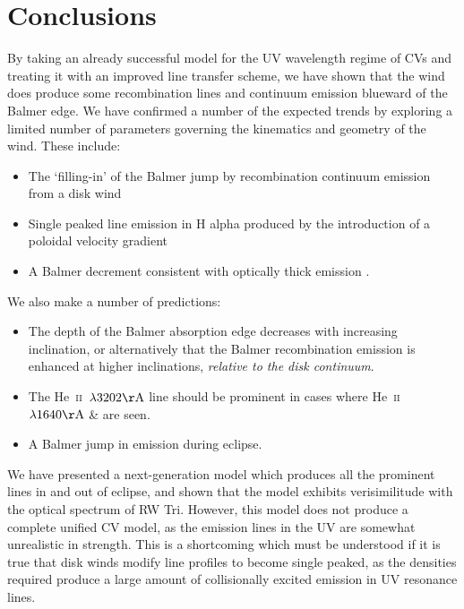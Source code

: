 \documentclass[preprint, a4paper, 11pt]{aastex}
\begin{document}
\newpage
%
%


\section{Conclusions}

By taking an already successful model
for the UV wavelength regime of CVs and treating 
it with an improved line transfer scheme, we have shown
that the wind does produce some recombination lines
and continuum emission blueward of the Balmer edge.
We have confirmed a number of the expected trends
by exploring a limited number of parameters governing the
kinematics and geometry of the wind. These include:

\renewcommand{\labelitemi}{$\bullet$}
\begin{itemize}
	\item The `filling-in' of the Balmer jump \citep{elitzur1983} by recombination 
	continuum emission from a disk wind
	\item Single peaked line emission in H alpha produced by 
	the introduction of a poloidal velocity gradient \citep{MC96}
	\item A Balmer decrement consistent with optically thick emission \citep{elitzur1983}.
\end{itemize}
\smallskip

\noindent We also make a number of predictions:

\begin{itemize}
	\item The depth of the Balmer absorption edge decreases with increasing inclination,
or alternatively that the Balmer recombination emission
is enhanced at higher inclinations, {\sl relative to the disk continuum}.
	\item The He~\textsc{ii}~$\lambda3202{\rm \AA}$ line should be
prominent in cases where He~\textsc{ii}~$\lambda1640{\rm \AA}$ \& 
\heiiopt are seen. 
	\item A Balmer jump in emission during eclipse.
\end{itemize}

\smallskip
We have presented a next-generation model
which produces all the prominent lines in and out of eclipse, and
shown that the model exhibits verisimilitude with the optical spectrum of RW Tri.
However, this model does not produce a complete unified CV model, as
the emission lines in the UV are somewhat unrealistic in strength.
This is a shortcoming which must be understood if it is true that
disk winds modify line profiles to become single peaked, as the 
densities required produce a large amount of collisionally excited emission
in UV resonance lines.
\end{document}
